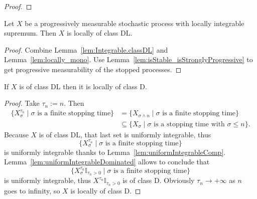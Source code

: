 \begin{proof}\leanok

\end{proof}

\begin{lemma}\label{lem:HasLocallyIntegrableSup.locally_classDL}
  \leanok
Let $X$ be a progressively measurable stochastic process with locally integrable supremum. Then $X$ is locally of class DL.
\end{lemma}

\begin{proof}\leanok
Combine Lemma~\ref{lem:Integrable.classDL} and Lemma~\ref{lem:locally_mono}. Use Lemma~\ref{lem:isStable_isStronglyProgressive} to get progressive measurability of the stopped processes.
\end{proof}


\begin{lemma}\label{lem:ClassDL.locally_classD}
  \leanok
If $X$ is of class DL then it is locally of class D.
\end{lemma}

\begin{proof}
  \leanok
Take $\tau_n := n$. Then
\begin{align*}
  \{X^{\tau_n}_\sigma \mid \sigma \text{ is a finite stopping time}\} & = \{X_{\sigma \land n} \mid \sigma \text{ is a finite stopping time}\} \\
  & \subseteq \{X_\sigma \mid \sigma \text{ is a stopping time with } \sigma \le n\}.
\end{align*}
Because $X$ is of class DL, that last set is uniformly integrable, thus
$$\{X^{\tau_n}_\sigma \mid \sigma \text{ is a finite stopping time}\}$$
is uniformly integrable thanks to Lemma~\ref{lem:uniformIntegrableComp}. Lemma~\ref{lem:uniformIntegrableDominated} allows to conclude that
$$\{X^{\tau_n}_\sigma \mathbb{I}_{\tau_n > 0} \mid \sigma \text{ is a finite stopping time}\}$$
is uniformly integrable, thus $X^{\tau_n} \mathbb{I}_{\tau_n > 0}$ is of class D. Obviously $\tau_n \rightarrow +\infty$ as $n$ goes to infinity, so $X$ is locally of class D.
\end{proof}


